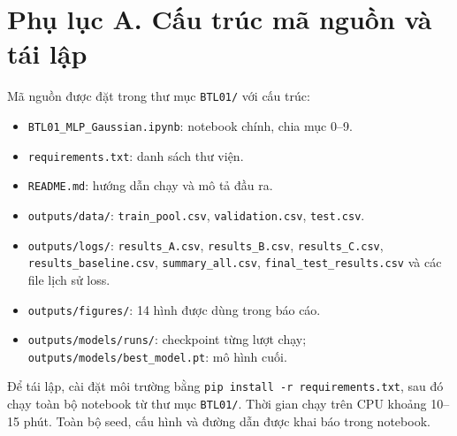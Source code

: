 \documentclass[12pt,a4paper]{article}
\begin{document}
\section*{Phụ lục A. Cấu trúc mã nguồn và tái lập}

Mã nguồn được đặt trong thư mục \texttt{BTL01/} với cấu trúc:

\begin{itemize}
\item \texttt{BTL01\_MLP\_Gaussian.ipynb}: notebook chính, chia mục 0--9.
\item \texttt{requirements.txt}: danh sách thư viện.
\item \texttt{README.md}: hướng dẫn chạy và mô tả đầu ra.
\item \texttt{outputs/data/}: \texttt{train\_pool.csv}, \texttt{validation.csv}, \texttt{test.csv}.
\item \texttt{outputs/logs/}: \texttt{results\_A.csv}, \texttt{results\_B.csv}, \texttt{results\_C.csv}, \texttt{results\_baseline.csv}, \texttt{summary\_all.csv}, \texttt{final\_test\_results.csv} và các file lịch sử loss.
\item \texttt{outputs/figures/}: 14 hình được dùng trong báo cáo.
\item \texttt{outputs/models/runs/}: checkpoint từng lượt chạy; \texttt{outputs/models/best\_model.pt}: mô hình cuối.
\end{itemize}

Để tái lập, cài đặt môi trường bằng \texttt{pip install -r requirements.txt}, sau đó chạy toàn bộ notebook từ thư mục \texttt{BTL01/}. Thời gian chạy trên CPU khoảng 10--15 phút. Toàn bộ seed, cấu hình và đường dẫn được khai báo trong notebook.
\end{document}
